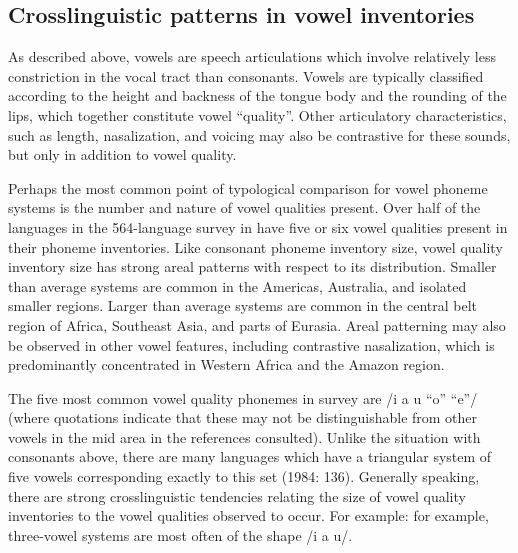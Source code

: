 \subsection{Crosslinguistic patterns in vowel inventories}\label{sec:4.1.2}

  As described above, vowels are speech articulations which involve relatively less constriction in the vocal tract than consonants. Vowels are typically classified according to the height and backness of the tongue body and the rounding of the lips, which together constitute vowel ``quality''. Other articulatory characteristics, such as length, nasalization, and voicing may also be contrastive for these sounds, but only in addition to vowel quality.

 \hspace*{-0.19002pt}Perhaps the most common point of typological comparison for vowel phoneme systems is the number and nature of vowel qualities present. Over half of the languages in the 564-language survey in \citet{Maddieson2013c} have five or six vowel qualities present in their phoneme inventories. Like consonant phoneme inventory size, vowel quality inventory size has strong areal patterns with respect to its distribution. Smaller than average systems are common in the Americas, Australia, and isolated smaller regions. Larger than average systems are common in the central belt region of Africa, Southeast Asia, and parts of Eurasia. Areal patterning may also be observed in other vowel features, including contrastive nasalization, which is predominantly concentrated in Western Africa and the Amazon region.

  The five most common vowel quality phonemes in  survey are /i a u “o” “e”/ (where quotations indicate that these may not be distinguishable from other vowels in the mid area in the references consulted). Unlike the situation with consonants above, there are many languages which have a triangular system of five vowels corresponding exactly to this set (1984: 136). Generally speaking, there are strong crosslinguistic tendencies relating the size of vowel quality inventories to the vowel qualities observed to occur. For example: for example, three-vowel systems are most often of the shape /i a u/. 

